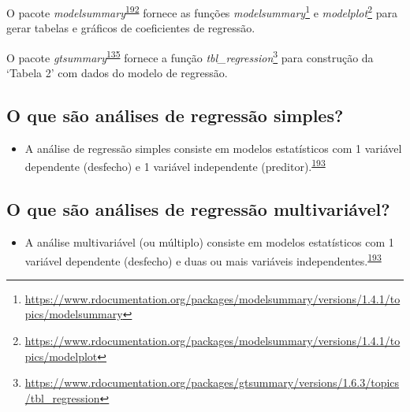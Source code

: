 \documentclass[
  a4paper,
]{book}
\providecommand{\tightlist}{%
  \setlength{\itemsep}{0pt}\setlength{\parskip}{0pt}}
\renewcommand{\href}[2]{#2\footnote{\url{#1}}}
\newenvironment{infobox}[1]
  {
  \begin{itemize}
  \renewcommand{\labelitemi}{
    \raisebox{-.7\height}[0pt][0pt]{
      {\setkeys{Gin}{width=3em,keepaspectratio}
        \texttt{[image: \#1]}}
    }
  }
  \setlength{\fboxsep}{1em}
  \begin{blackbox}
  \item
  }
  {
  \end{blackbox}
  \end{itemize}
  }
\begin{document}
\begin{infobox}{images/Rlogo}
O pacote \emph{modelsummary}\textsuperscript{\protect\hyperlink{ref-modelsummary}{192}} fornece as funções \href{https://www.rdocumentation.org/packages/modelsummary/versions/1.4.1/topics/modelsummary}{\emph{modelsummary}} e \href{https://www.rdocumentation.org/packages/modelsummary/versions/1.4.1/topics/modelplot}{\emph{modelplot}} para gerar tabelas e gráficos de coeficientes de regressão.

\end{infobox}

\begin{infobox}{images/Rlogo}
O pacote \emph{gtsummary}\textsuperscript{\protect\hyperlink{ref-gtsummary-2}{135}} fornece a função \href{https://www.rdocumentation.org/packages/gtsummary/versions/1.6.3/topics/tbl_regression}{\emph{tbl\_regression}} para construção da `Tabela 2' com dados do modelo de regressão.

\end{infobox}

\hypertarget{o-que-suxe3o-anuxe1lises-de-regressuxe3o-simples}{%
\subsection{O que são análises de regressão simples?}\label{o-que-suxe3o-anuxe1lises-de-regressuxe3o-simples}}

\begin{itemize}
\tightlist
\item
  A análise de regressão simples consiste em modelos estatísticos com 1 variável dependente (desfecho) e 1 variável independente (preditor).\textsuperscript{\protect\hyperlink{ref-Hidalgo2013}{193}}
\end{itemize}

\hypertarget{o-que-suxe3o-anuxe1lises-de-regressuxe3o-multivariuxe1vel}{%
\subsection{O que são análises de regressão multivariável?}\label{o-que-suxe3o-anuxe1lises-de-regressuxe3o-multivariuxe1vel}}

\begin{itemize}
\tightlist
\item
  A análise multivariável (ou múltiplo) consiste em modelos estatísticos com 1 variável dependente (desfecho) e duas ou mais variáveis independentes.\textsuperscript{\protect\hyperlink{ref-Hidalgo2013}{193}}
\end{itemize}
\end{document}
